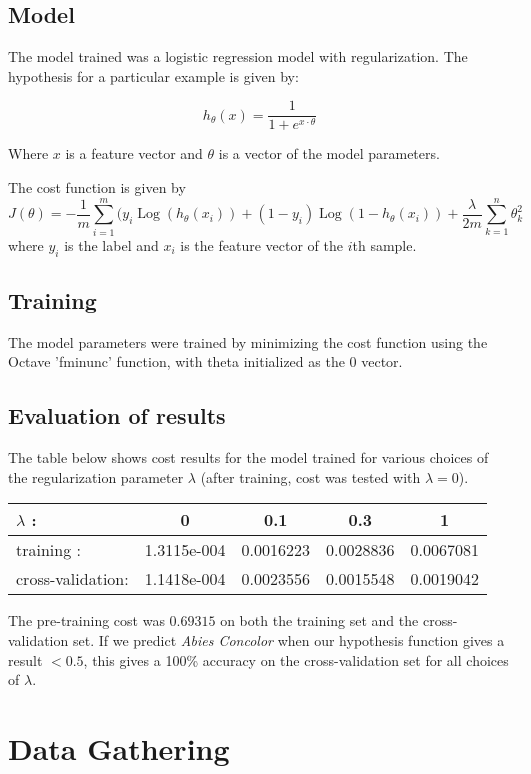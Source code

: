 \documentclass[12pt]{article}
\DeclareMathOperator{\Log}{Log}
\newcommand*{\octfont}{\fontfamily{cmvtt}\selectfont}
\begin{document}
\subsection{Model} The model trained was a logistic regression model with regularization. The hypothesis for a particular example is given by:

\[
h_\theta(x) = \frac{1}{1+e^{x \cdot \theta}}
\]

Where $x$ is a feature vector and $\theta$ is a vector of the  model parameters.

The cost function is given by
\[
 J(\theta) = -\frac{1}{m}\sum_{i = 1}^m (y_i\Log(h_\theta(x_i))+(1-y_i)\Log(1-h_\theta(x_i)) + \frac{\lambda}{2m} \sum_{k=1}^n \theta_k^2
\]
where $y_i$ is the label and $x_i$ is the feature vector of the $i$th sample.

\subsection{Training} The model parameters were trained by minimizing the cost function using the Octave '{\octfont fminunc}' function, with theta initialized as the $0$ vector.

\subsection{Evaluation of results} The table below shows cost results for the model trained for various choices of the regularization parameter $\lambda$ (after training, cost was tested with $\lambda = 0$).

\begin{center}
\begin{tabular}{|l|c|c|c|c|}
 \hline
 $\lambda$ : & 0 & 0.1 & 0.3 & 1\\
 \hline
 training : & 1.3115e-004 & 0.0016223 & 0.0028836 & 0.0067081\\
 cross-validation: & 1.1418e-004 & 0.0023556 & 0.0015548 & 0.0019042 \\
 \hline
\end{tabular}
\end{center}

The pre-training cost was $0.69315$ on both the training set and the cross-validation set. If we predict \textit{Abies Concolor} when our hypothesis function gives a result $<0.5$, this gives a 100\% accuracy on the cross-validation set for all choices of $\lambda$.


\section{Data Gathering}
\end{document}

